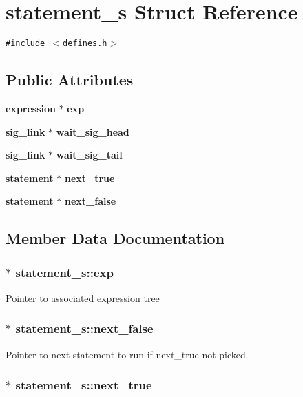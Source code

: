 \section{statement\_\-s Struct Reference}
\label{structstatement__s}
{\tt \#include $<$defines.h$>$}

\subsection*{Public Attributes}
\begin{CompactItemize}
\item 
{\bf expression} $\ast$ {\bf exp}
\item 
{\bf sig\_\-link} $\ast$ {\bf wait\_\-sig\_\-head}
\item 
{\bf sig\_\-link} $\ast$ {\bf wait\_\-sig\_\-tail}
\item 
{\bf statement} $\ast$ {\bf next\_\-true}
\item 
{\bf statement} $\ast$ {\bf next\_\-false}
\end{CompactItemize}


\subsection{Member Data Documentation}
\subsubsection{$\ast$ {\bf statement\_\-s::exp}}\label{structstatement__s_o0}


Pointer to associated expression tree 
\subsubsection{$\ast$ {\bf statement\_\-s::next\_\-false}}\label{structstatement__s_o4}


Pointer to next statement to run if next\_\-true not picked 
\subsubsection{$\ast$ {\bf statement\_\-s::next\_\-true}}\label{structstatement__s_o3}


